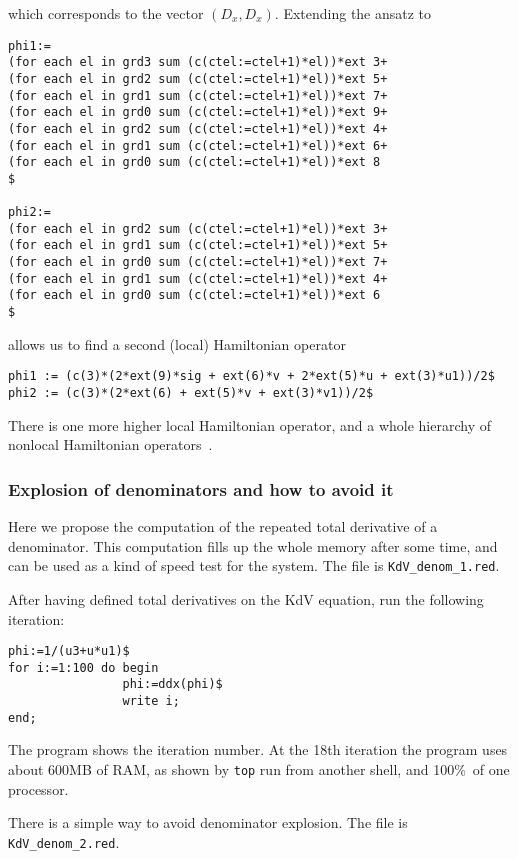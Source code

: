 which corresponds to the vector $(D_x,D_x)$.  Extending the ansatz to
\begin{verbatim}
phi1:=
(for each el in grd3 sum (c(ctel:=ctel+1)*el))*ext 3+
(for each el in grd2 sum (c(ctel:=ctel+1)*el))*ext 5+
(for each el in grd1 sum (c(ctel:=ctel+1)*el))*ext 7+
(for each el in grd0 sum (c(ctel:=ctel+1)*el))*ext 9+
(for each el in grd2 sum (c(ctel:=ctel+1)*el))*ext 4+
(for each el in grd1 sum (c(ctel:=ctel+1)*el))*ext 6+
(for each el in grd0 sum (c(ctel:=ctel+1)*el))*ext 8
$

phi2:=
(for each el in grd2 sum (c(ctel:=ctel+1)*el))*ext 3+
(for each el in grd1 sum (c(ctel:=ctel+1)*el))*ext 5+
(for each el in grd0 sum (c(ctel:=ctel+1)*el))*ext 7+
(for each el in grd1 sum (c(ctel:=ctel+1)*el))*ext 4+
(for each el in grd0 sum (c(ctel:=ctel+1)*el))*ext 6
$
\end{verbatim}
allows us to find a second (local) Hamiltonian operator
\begin{verbatim}
phi1 := (c(3)*(2*ext(9)*sig + ext(6)*v + 2*ext(5)*u + ext(3)*u1))/2$
phi2 := (c(3)*(2*ext(6) + ext(5)*v + ext(3)*v1))/2$
\end{verbatim}
There is one more higher local Hamiltonian operator, and a whole hierarchy of
nonlocal Hamiltonian operators~\cite{KKV}.


\subsubsection{Explosion of denominators and how to avoid it}

Here we propose the computation of the repeated total derivative of a
denominator. This computation fills up the whole memory after some time, and
can be used as a kind of speed test for the system. The file is
\texttt{KdV\_denom\_1.red}.

After having defined total derivatives on the KdV equation, run the following
iteration:
\begin{verbatim}
phi:=1/(u3+u*u1)$
for i:=1:100 do begin
                phi:=ddx(phi)$
                write i;
end;
\end{verbatim}
The program shows the iteration number. At the 18th iteration the program uses
about 600MB of RAM, as shown by \texttt{top} run from another shell, and 100\%\
of one processor.

There is a simple way to avoid denominator explosion. The file is
\texttt{KdV\_denom\_2.red}.

